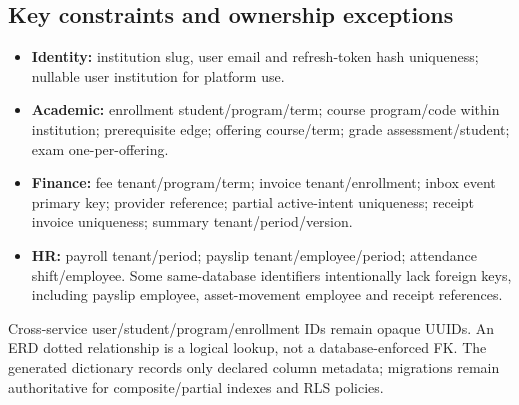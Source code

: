 \documentclass[10pt,a4paper]{article}
\begin{document}
\subsection{Key constraints and ownership exceptions}
\begin{itemize}
\item \textbf{Identity:} institution slug, user email and refresh-token hash uniqueness;
nullable user institution for platform use.
\item \textbf{Academic:} enrollment student/program/term; course program/code within institution;
prerequisite edge; offering course/term; grade assessment/student; exam one-per-offering.
\item \textbf{Finance:} fee tenant/program/term; invoice tenant/enrollment; inbox event primary
key; provider reference; partial active-intent uniqueness; receipt invoice uniqueness;
summary tenant/period/version.
\item \textbf{HR:} payroll tenant/period; payslip tenant/employee/period; attendance shift/employee.
Some same-database identifiers intentionally lack foreign keys, including payslip employee,
asset-movement employee and receipt references.
\end{itemize}
Cross-service user/student/program/enrollment IDs remain opaque UUIDs.
An ERD dotted relationship is a logical lookup, not a database-enforced FK.
The generated dictionary records only declared column metadata; migrations remain
authoritative for composite/partial indexes and RLS policies.
\end{document}
